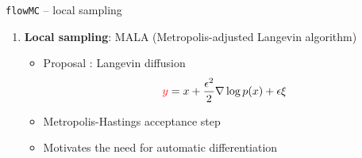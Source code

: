   
      
      
      
      
      
      
      
      
    
  
  
  \begin{frame}{\texttt{flowMC} -- local sampling}
  
  \begin{enumerate}
    \item \textbf{Local sampling}: MALA (Metropolis-adjusted Langevin algorithm)
    
    \vspace{3mm}
    
    \begin{itemize}
      \item Proposal : Langevin diffusion
      \begin{equation*}
        \textcolor{red}{y} = x + \frac{\epsilon^2}{2} \nabla \log p(x) + \epsilon \xi
      \end{equation*}
  
      \item Metropolis-Hastings acceptance step
      
      \vspace{3mm}

      \item Motivates the need for automatic differentiation
    \end{itemize}
    
  \end{enumerate}
  
  
  \end{frame}
  
